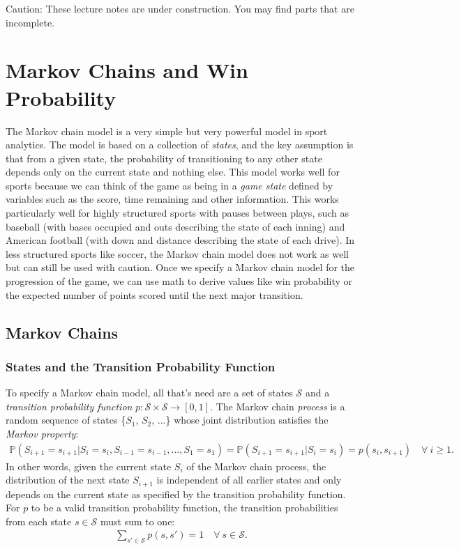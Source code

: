 \documentclass{article}
\begin{document}
  \begin{framed}
    {\sc Caution:} These lecture notes are under construction. You may find parts that are incomplete.
  \end{framed}

  \setcounter{section}{5}
  \section{\sc Markov Chains and Win Probability}

  The Markov chain model is a very simple but very powerful model in sport analytics. The model is based on a collection of {\it states}, and the key assumption is that from a given state, the probability of transitioning to any other state depends only on the current state and nothing else. This model works well for sports because we can think of the game as being in a {\it game state} defined by variables such as the score, time remaining and other information. This works particularly well for highly structured sports with pauses between plays, such as baseball (with bases occupied and outs describing the state of each inning) and American football (with down and distance describing the state of each drive). In less structured sports like soccer, the Markov chain model does not work as well but can still be used with caution. Once we specify a Markov chain model for the progression of the game, we can use math to derive values like win probability or the expected number of points scored until the next major transition.

  \subsection{\sc Markov Chains}
  \label{sec:markov-chains}

    \subsubsection{\sc States and the Transition Probability Function}

    To specify a Markov chain model, all that's need are a set of states $\mathcal S$ and a {\it transition probability function} $p : \mathcal S \times \mathcal S \rightarrow [0, 1]$. The Markov chain {\it process} is a random sequence of states \{$S_1$, $S_2$, ...\} whose joint distribution satisfies the {\it Markov property}:
    \begin{align*}
      \mathbb{P}(S_{i+1} = s_{i+1} | S_i = s_i, S_{i - 1} = s_{i - 1}, ..., S_1 = s_1) = \mathbb{P}(S_{i+1} = s_{i+1} | S_i = s_i) = p(s_i, s_{i+1}) \quad \forall~i \ge 1.
    \end{align*}
    In other words, given the current state $S_i$ of the Markov chain process, the distribution of the next state $S_{i+1}$ is independent of all earlier states and only depends on the current state as specified by the transition probability function. For $p$ to be a valid transition probability function, the transition probabilities from each state $s \in \mathcal S$ must sum to one:
    \begin{align*}
      \sum_{s' \in \mathcal S} p(s, s') = 1 \quad \forall~s \in \mathcal S.
    \end{align*}
\end{document}
